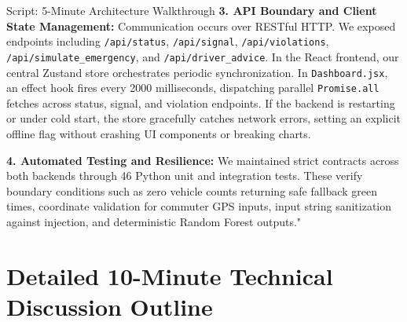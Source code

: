 \begin{interviewq}{Script: 5-Minute Architecture Walkthrough}
\textbf{3. API Boundary and Client State Management:}
Communication occurs over RESTful HTTP. We exposed endpoints including \texttt{/api/status}, \texttt{/api/signal}, \texttt{/api/violations}, \texttt{/api/simulate\_emergency}, and \texttt{/api/driver\_advice}. In the React frontend, our central Zustand store orchestrates periodic synchronization. In \texttt{Dashboard.jsx}, an effect hook fires every 2000 milliseconds, dispatching parallel \texttt{Promise.all} fetches across status, signal, and violation endpoints. If the backend is restarting or under cold start, the store gracefully catches network errors, setting an explicit offline flag without crashing UI components or breaking charts.

\textbf{4. Automated Testing and Resilience:}
We maintained strict contracts across both backends through 46 Python unit and integration tests. These verify boundary conditions such as zero vehicle counts returning safe fallback green times, coordinate validation for commuter GPS inputs, input string sanitization against injection, and deterministic Random Forest outputs."
\end{interviewq}

\section{Detailed 10-Minute Technical Discussion Outline}
\label{sec:script_10min}

